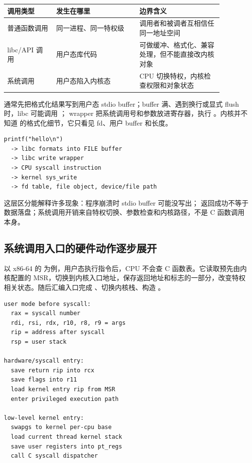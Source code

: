 \begin{longtable}{|p{0.2\linewidth}|p{0.34\linewidth}|p{0.34\linewidth}|}
\toprule
调用类型 & 发生在哪里 & 边界含义 \\
\midrule
普通函数调用 & 同一进程、同一特权级 & 调用者和被调者互相信任同一地址空间 \\\tablerowrule
libc/API 调用 & 用户态库代码 & 可做缓冲、格式化、兼容处理，但不能直接改内核对象 \\\tablerowrule
系统调用 & 用户态陷入内核态 & CPU 切换特权，内核检查权限和对象状态 \\
\bottomrule
\end{longtable}

 通常先把格式化结果写到用户态 stdio buffer；buffer 满、遇到换行或显式 flush 时，libc 可能调用 ； wrapper 把系统调用号和参数放进寄存器，执行 。内核并不知道  的格式化细节，它只看见 fd、用户 buffer 和长度。

\begin{lstlisting}
printf("hello\n")
  -> libc formats into FILE buffer
  -> libc write wrapper
  -> CPU syscall instruction
  -> kernel sys_write
  -> fd table, file object, device/file path
\end{lstlisting}

这层区分能解释许多现象：程序崩溃时 stdio buffer 可能没写出； 返回成功不等于数据落盘；系统调用开销来自特权切换、参数检查和内核路径，不是 C 函数调用本身。

\subsection{系统调用入口的硬件动作逐步展开}

以 x86-64 的  为例，用户态执行指令后，CPU 不会查 C 函数表。它读取预先由内核配置的 MSR，切换到内核入口地址，保存返回地址和标志的一部分，改变特权相关状态。随后汇编入口完成 、切换内核栈、构造 。

\begin{lstlisting}
user mode before syscall:
  rax = syscall number
  rdi, rsi, rdx, r10, r8, r9 = args
  rip = address after syscall
  rsp = user stack

hardware/syscall entry:
  save return rip into rcx
  save flags into r11
  load kernel entry rip from MSR
  enter privileged execution path

low-level kernel entry:
  swapgs to kernel per-cpu base
  load current thread kernel stack
  save user registers into pt_regs
  call C syscall dispatcher
\end{lstlisting}

